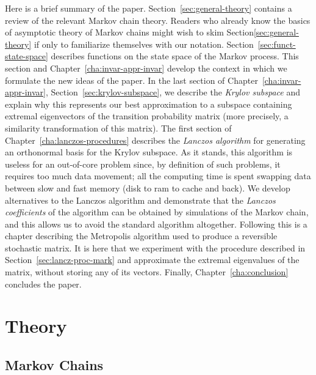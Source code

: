 \documentclass[12pt,letterpaper]{report}
\theoremstyle{plain}
\theoremstyle{definition}
\theoremstyle{remark}
\numberwithin{theorem}{chapter}
\numberwithin{claim}{chapter}
\numberwithin{equation}{chapter}
\numberwithin{conjecture}{chapter}
\newcommand\<{\ensuremath{\langle}}
\renewcommand\>{\ensuremath{\rangle}}
\begin{document}
Here is a brief summary of the paper. Section~\ref{sec:general-theory} contains
a review of the relevant Markov chain theory. Readers who already know the
basics of asymptotic theory of Markov chains might wish to skim 
Section\ref{sec:general-theory} if only to familiarize themselves with our
notation. Section~\ref{sec:funct-state-space} describes functions on the state 
space of the Markov process. This section and Chapter~\ref{cha:invar-appr-invar}
develop the context in which we formulate the new ideas of the paper. In the
last section of Chapter~\ref{cha:invar-appr-invar},
Section~\ref{sec:krylov-subspace}, we describe the \emph{Krylov subspace} and
explain why this represents our best approximation to a subspace containing 
extremal eigenvectors of the transition probability matrix (more
  precisely, a similarity transformation of this matrix). The first section of
Chapter~\ref{cha:lanczos-procedures} describes the \emph{Lanczos algorithm} for
generating an orthonormal basis for the Krylov subspace. As it stands, this
algorithm is useless for an out-of-core problem since, by
definition of such problems, it requires too much data movement; all the
computing time is spent swapping data between slow and fast memory (disk to ram
to cache and back). We develop alternatives to the Lanczos algorithm and
demonstrate that the \emph{Lanczos coefficients} of the algorithm can be
obtained by simulations of the Markov chain, and this allows us to avoid
the standard algorithm altogether. Following this is a chapter describing the
Metropolis algorithm used to produce a reversible stochastic matrix. It is here
that we experiment with the procedure described in
Section~\ref{sec:lancz-proc-mark} and approximate the extremal eigenvalues of
the matrix, without storing any of its vectors. Finally,
Chapter~\ref{cha:conclusion} concludes the paper. 


\part{Theory\label{part:one}}%

\chapter{Markov Chains}
\end{document}
